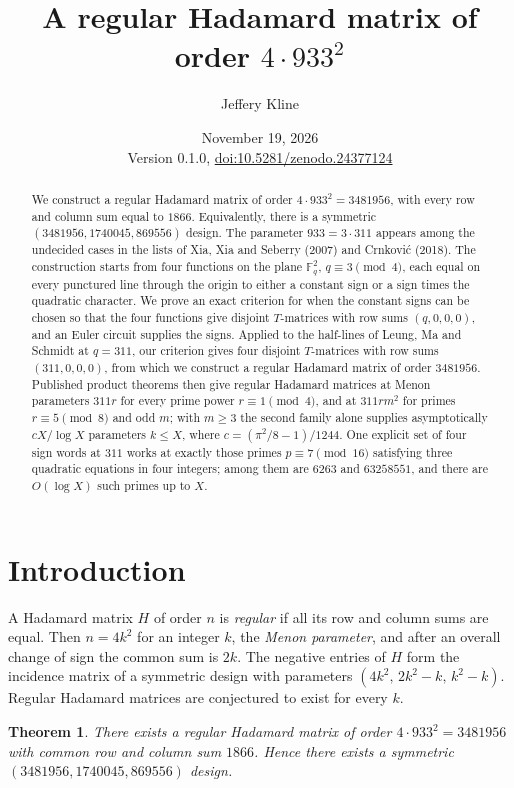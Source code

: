 \documentclass[11pt]{article}
\title{A regular Hadamard matrix of order $4\cdot933^2$}
\author{Jeffery Kline}
\date{November 19, 2026\\[3pt]\small Version 0.1.0, \href{https://doi.org/10.5281/zenodo.24377124}{doi:10.5281/zenodo.24377124}}
\newtheorem{theorem}{Theorem}
\theoremstyle{remark}
\newcommand{\F}{\mathbb F}
\begin{document}
\maketitle

\begin{abstract}
We construct a regular Hadamard matrix of order $4\cdot933^2=3481956$, with every row and column sum equal to $1866$. Equivalently, there is a symmetric $(3481956,1740045,869556)$ design. The parameter $933=3\cdot311$ appears among the undecided cases in the lists of Xia, Xia and Seberry (2007) and Crnkovi\'c (2018). The construction starts from four functions on the plane $\F_q^2$, $q\equiv3\pmod4$, each equal on every punctured line through the origin to either a constant sign or a sign times the quadratic character. We prove an exact criterion for when the constant signs can be chosen so that the four functions give disjoint $T$-matrices with row sums $(q,0,0,0)$, and an Euler circuit supplies the signs. Applied to the half-lines of Leung, Ma and Schmidt at $q=311$, our criterion gives four disjoint $T$-matrices with row sums $(311,0,0,0)$, from which we construct a regular Hadamard matrix of order $3481956$. Published product theorems then give regular Hadamard matrices at Menon parameters $311r$ for every prime power $r\equiv1\pmod4$, and at $311rm^2$ for primes $r\equiv5\pmod8$ and odd $m$; with $m\ge3$ the second family alone supplies asymptotically $cX/\log X$ parameters $k\le X$, where $c=(\pi^2/8-1)/1244$. One explicit set of four sign words at $311$ works at exactly those primes $p\equiv7\pmod{16}$ satisfying three quadratic equations in four integers; among them are $6263$ and $63258551$, and there are $O(\log X)$ such primes up to $X$.
\end{abstract}

\section{Introduction}
A Hadamard matrix $H$ of order $n$ is \emph{regular} if all its row and column sums are equal. Then $n=4k^2$ for an integer $k$, the \emph{Menon parameter}, and after an overall change of sign the common sum is $2k$. The negative entries of $H$ form the incidence matrix of a symmetric design with parameters $(4k^2,\,2k^2-k,\,k^2-k)$. Regular Hadamard matrices are conjectured to exist for every $k$.

\begin{theorem}\label{main}
There exists a regular Hadamard matrix of order $4\cdot933^2=3481956$ with common row and column sum $1866$. Hence there exists a symmetric $(3481956,1740045,869556)$ design.
\end{theorem}
\end{document}
